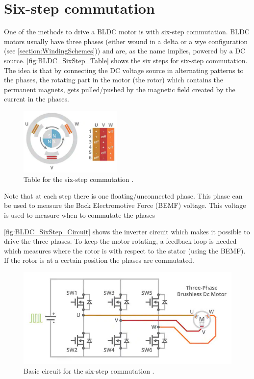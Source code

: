 \documentclass[]{report}
\begin{document}
\section{Six-step commutation} \label{section:six-step_commutation}
One of the methods to drive a BLDC motor is with six-step commutation. BLDC motors usually have three phases (either wound in a delta or a wye configuration (see \ref{section:WindingSchemes})) and are, as the name implies, powered by a DC source. \autoref{fig:BLDC_SixStep_Table} shows the six steps for six-step commutation. The idea is that by connecting the DC voltage source in alternating patterns to the phases, the rotating part in the motor (the rotor) which contains the permanent magnets, gets pulled/pushed by the magnetic field created by the current in the phases.

\begin{figure}[h]
	\centering
	\includegraphics[width=0.45\textwidth]{BLDC_SixStep_Table.jpeg}
	\caption{Table for the six-step commutation \cite{Digikey_BLDC_SixStep}.}
	\label{fig:BLDC_SixStep_Table}
\end{figure}

Note that at each step there is one floating/unconnected phase. This phase can be used to measure the Back Electromotive Force (BEMF) voltage. This voltage is used to measure when to commutate the phases

\autoref{fig:BLDC_SixStep_Circuit} shows the inverter circuit which makes it possible to drive the three phases. To keep the motor rotating, a feedback loop is needed which measures where the rotor is with respect to the stator (using the BEMF). If the rotor is at a certain position the phases are commutated.

\begin{figure}[h]
	\centering
	\includegraphics[width=\textwidth]{BLDC_SixStep_Circuit.jpeg}
	\caption{Basic circuit for the six-step commutation \cite{Digikey_BLDC_SixStep}.}
	\label{fig:BLDC_SixStep_Circuit}
\end{figure}
\end{document}
